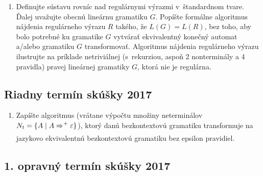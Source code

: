 \documentclass[11pt,a4paper]{article}
\begin{document}
		\begin{enumerate}
			\item Definujte sústavu rovníc nad regulárnymi výrazmi v~štandardnom tvare. Ďalej uvažujte obecnú lineárnu gramatiku $G$. Popíšte formálne algoritmus nájdenia regulárneho výrazu $R$ takého, že $L(G) = L(R)$, bez toho, aby bolo potrebné ku gramatike $G$ vytvárať ekvivalentný konečný automat a/alebo gramatiku $G$ transformovať. Algoritmus nájdenia regulárneho výrazu ilustrujte na príklade netriviálnej (s~rekurziou, aspoň 2 nonterminály a 4 pravidla) pravej lineárnej gramatiky $G$, ktorá nie je regulárna.
		\end{enumerate}

		\subsection{Riadny termín skúšky 2017}

		\begin{enumerate}
			\item Zapíšte algoritmus (vrátane výpočtu množiny neterminálov $N_t = \{ A \mid A \xRightarrow{}^+ \varepsilon\}$), ktorý danú bezkontextovú gramatiku transformuje na jazykovo ekvivalentnú bezkontextovú gramatiku bez epsilon pravidiel.
		\end{enumerate}

		\subsection{1. opravný termín skúšky 2017}
\end{document}

